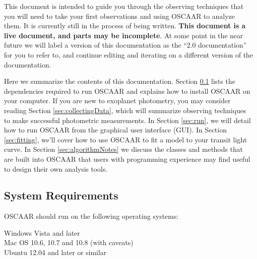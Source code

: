 \documentclass[a4paper]{article}
\begin{document}
This document is intended to guide you through the observing techniques that you will need to take your first observations and using OSCAAR to analyze them. It is currently still in the process of being written. {\bf This document is a live document, and parts may be incomplete}. At some point in the near future we will label a version of this documentation as the ``2.0 documentation'' for you to refer to, and continue editing and iterating on a different version of the documentation. 

Here we summarize the contents of this documentation. Section \ref{sec:systemRequirements} lists the dependencies required to run OSCAAR and explains how to install OSCAAR on your computer. If you are new to exoplanet photometry, you may consider reading Section \ref{sec:collectingData}, which will summarize observing techniques to make successful photometric measurements. In Section \ref{sec:run}, we will detail how to run OSCAAR from the graphical user interface (GUI). In Section \ref{sec:fitting}, we'll cover how to use OSCAAR to fit a model to your transit light curve. In Section \ref{sec:algorithmNotes} we discuss the classes and methods that are built into OSCAAR that users with programming experience may find useful to design their own analysis tools. 

\subsection{System Requirements} \label{sec:systemRequirements}

OSCAAR should run on the following operating systems:

\indent Windows Vista and later \\
\indent Mac OS 10.6, 10.7 and 10.8 (with caveats) \\
\indent Ubuntu 12.04 and later or similar \\
\end{document}
